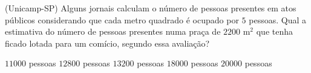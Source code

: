 \noindent\parbox{\linewidth}{

(Unicamp-SP) Alguns jornais calculam o número de pessoas presentes em atos públicos considerando que cada metro quadrado é ocupado por $5$ pessoas. Qual a estimativa do número de pessoas presentes numa praça de $2200$ m$^2$ que tenha ficado lotada para um comício, segundo essa avaliação?

$11000$ pessoas
$12800$ pessoas
$13200$ pessoas
$18000$ pessoas
$20000$ pessoas



}


